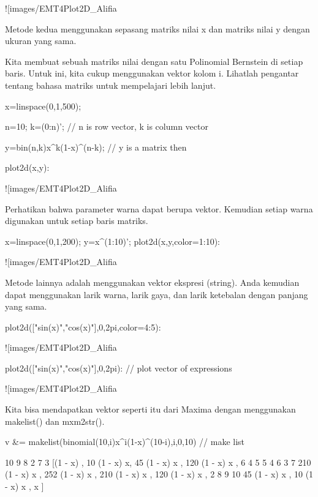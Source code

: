 \documentclass{article}
\begin{document}
![images/EMT4Plot2D_Alifia%

Metode kedua menggunakan sepasang matriks nilai x dan matriks nilai y
dengan ukuran yang sama.


Kita membuat sebuah matriks nilai dengan satu Polinomial Bernstein di
setiap baris. Untuk ini, kita cukup menggunakan vektor kolom i.
Lihatlah pengantar tentang bahasa matriks untuk mempelajari lebih
lanjut.


\>x=linspace(0,1,500);

\>n=10; k=(0:n)'; // n is row vector, k is column vector

\>y=bin(n,k)\*x^k\*(1-x)^(n-k); // y is a matrix then

\>plot2d(x,y):


![images/EMT4Plot2D_Alifia%

Perhatikan bahwa parameter warna dapat berupa vektor. Kemudian setiap
warna digunakan untuk setiap baris matriks.


\>x=linspace(0,1,200); y=x^(1:10)'; plot2d(x,y,color=1:10):


![images/EMT4Plot2D_Alifia%

Metode lainnya adalah menggunakan vektor ekspresi (string). Anda
kemudian dapat menggunakan larik warna, larik gaya, dan larik
ketebalan dengan panjang yang sama.


\>plot2d(["sin(x)","cos(x)"],0,2pi,color=4:5): 


![images/EMT4Plot2D_Alifia%

\>plot2d(["sin(x)","cos(x)"],0,2pi): // plot vector of expressions


![images/EMT4Plot2D_Alifia%

Kita bisa mendapatkan vektor seperti itu dari Maxima dengan
menggunakan makelist() dan mxm2str().


\>v &= makelist(binomial(10,i)\*x^i\*(1-x)^(10-i),i,0,10) // make list


    
                   10            9              8  2             7  3
           [(1 - x)  , 10 (1 - x)  x, 45 (1 - x)  x , 120 (1 - x)  x , 
               6  4             5  5             4  6             3  7
    210 (1 - x)  x , 252 (1 - x)  x , 210 (1 - x)  x , 120 (1 - x)  x , 
              2  8              9   10
    45 (1 - x)  x , 10 (1 - x) x , x  ]
    
\end{document}
